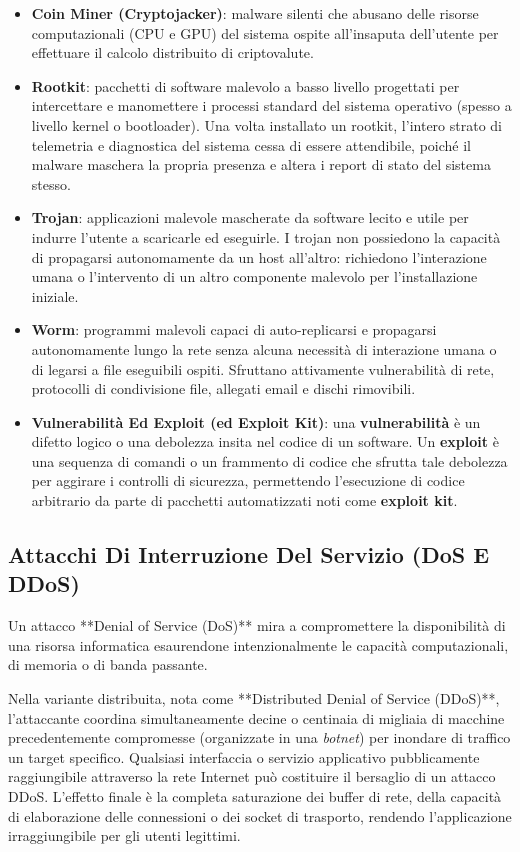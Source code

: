 \documentclass[11pt, a4paper]{article}
\begin{document}
\begin{itemize}[leftmargin=*]
    \item \textbf{Coin Miner (Cryptojacker)}: malware silenti che abusano delle risorse computazionali (CPU e GPU) del sistema ospite all'insaputa dell'utente per effettuare il calcolo distribuito di criptovalute.
    \item \textbf{Rootkit}: pacchetti di software malevolo a basso livello progettati per intercettare e manomettere i processi standard del sistema operativo (spesso a livello kernel o bootloader). Una volta installato un rootkit, l'intero strato di telemetria e diagnostica del sistema cessa di essere attendibile, poiché il malware maschera la propria presenza e altera i report di stato del sistema stesso.
    \item \textbf{Trojan}: applicazioni malevole mascherate da software lecito e utile per indurre l'utente a scaricarle ed eseguirle. I trojan non possiedono la capacità di propagarsi autonomamente da un host all'altro: richiedono l'interazione umana o l'intervento di un altro componente malevolo per l'installazione iniziale.
    \item \textbf{Worm}: programmi malevoli capaci di auto-replicarsi e propagarsi autonomamente lungo la rete senza alcuna necessità di interazione umana o di legarsi a file eseguibili ospiti. Sfruttano attivamente vulnerabilità di rete, protocolli di condivisione file, allegati email e dischi rimovibili.
    \item \textbf{Vulnerabilità Ed Exploit (ed Exploit Kit)}: una \textbf{vulnerabilità} è un difetto logico o una debolezza insita nel codice di un software. Un \textbf{exploit} è una sequenza di comandi o un frammento di codice che sfrutta tale debolezza per aggirare i controlli di sicurezza, permettendo l'esecuzione di codice arbitrario da parte di pacchetti automatizzati noti come \textbf{exploit kit}.
\end{itemize}

\subsection{Attacchi Di Interruzione Del Servizio (DoS E DDoS)}

Un attacco **Denial of Service (DoS)** mira a compromettere la disponibilità di una risorsa informatica esaurendone intenzionalmente le capacità computazionali, di memoria o di banda passante.

Nella variante distribuita, nota come **Distributed Denial of Service (DDoS)**, l'attaccante coordina simultaneamente decine o centinaia di migliaia di macchine precedentemente compromesse (organizzate in una \emph{botnet}) per inondare di traffico un target specifico. Qualsiasi interfaccia o servizio applicativo pubblicamente raggiungibile attraverso la rete Internet può costituire il bersaglio di un attacco DDoS. L'effetto finale è la completa saturazione dei buffer di rete, della capacità di elaborazione delle connessioni o dei socket di trasporto, rendendo l'applicazione irraggiungibile per gli utenti legittimi.
\end{document}
